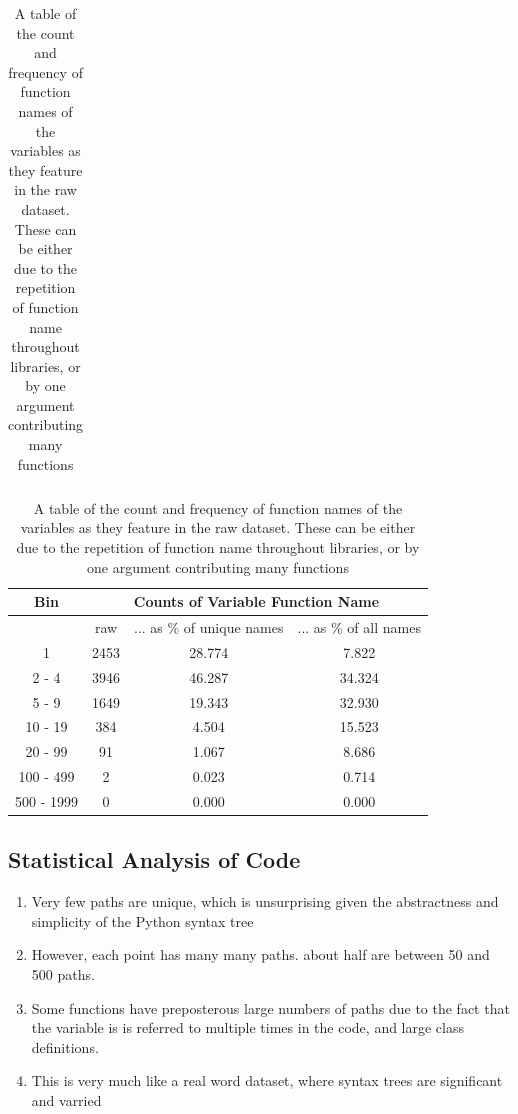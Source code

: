 \begin{table}[p]
\begin{center}
\begin{tabular}{c | c | c | c  }
    \end{tabular}
        \caption { A table of the count and frequency of function names as they feature in the dataset. Although names are often repeated, a much greater fraction of data points have unique (name, description) pairs.}
    \label{table:name_desc_histogram}

    \begin{tabular}{c | c | c | c  }       
     Bin   & \multicolumn{3}{c}{Counts of Variable Function Name}   \\
    \hline
     &     raw &... as \% of unique names & ... as \% of all names   \\  
    \hline     
    1   &      2453 &   28.774 &    7.822  \\          
    2 - 4 &      3946 &   46.287 &   34.324  \\          
    5 - 9 &      1649 &   19.343 &   32.930  \\          
    10 - 19 &     384 &    4.504 &   15.523  \\          
    20 - 99 &      91 &    1.067 &    8.686  \\          
    100 - 499 &     2 &    0.023 &    0.714  \\          
    500 - 1999 &    0 &    0.000 &    0.000  \\             

    \end{tabular}
        \caption { A table of the count and frequency of function names of the variables as they feature in the raw dataset. 
        These can be either due to the repetition of function name throughout libraries, or by one argument contributing many functions }
    \label{table:function_histogram} 
    \end{center}
\end{table}



\subsection{Statistical Analysis of Code} %
\label{sub:statistical_analysis_of_code}

\begin{enumerate}
    \item Very few paths are unique, which is unsurprising given the abstractness and simplicity of the Python syntax tree
    \item However, each point has many many paths.  about half are between 50 and 500 paths.
    \item  Some functions have preposterous large numbers of paths due to the fact that the variable is is referred to multiple times in the code, and large class definitions. 
    \item This is very much like a real word dataset, where syntax trees are significant and varried
\end{enumerate}





